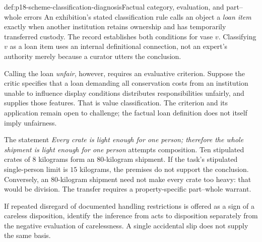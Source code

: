 \begin{hbexample}{def:p18-scheme-classification-diagnosis}{Factual category, evaluation, and part--whole errors}
An exhibition's stated classification rule calls an object a
\emph{loan item} exactly when another institution retains ownership
and has temporarily transferred custody. The record establishes
both conditions for vase \(v\). Classifying \(v\) as a loan item
uses an internal definitional connection, not an expert's authority
merely because a curator utters the conclusion.

Calling the loan \emph{unfair}, however, requires an evaluative
criterion. Suppose the critic specifies that a loan demanding all
conservation costs from an institution unable to influence display
conditions distributes responsibilities unfairly, and supplies those
features. That is value classification. The criterion and its
application remain open to challenge; the factual loan definition
does not itself imply unfairness.

The statement \emph{Every crate is light enough for one person;
therefore the whole shipment is light enough for one person}
attempts composition. Ten stipulated crates of \(8\) kilograms
form an \(80\)-kilogram shipment. If the task's stipulated single-person
limit is \(15\) kilograms, the premises do not support the conclusion.
Conversely, an \(80\)-kilogram shipment need not make every crate
too heavy: that would be division. The transfer requires a
property-specific part--whole warrant.

If repeated disregard of documented handling restrictions is offered
as a sign of a careless disposition, identify the inference from acts
to disposition separately from the negative evaluation of carelessness.
A single accidental slip does not supply the same basis.
\end{hbexample}

